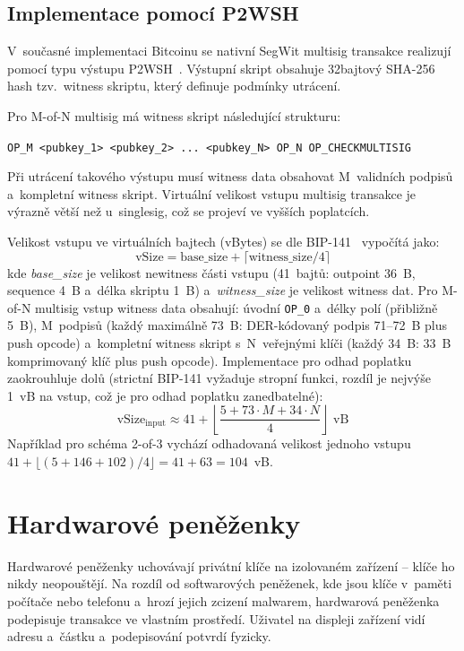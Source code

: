 \subsection{Implementace pomocí P2WSH}
\label{sec:p2wsh-multisig}

V~současné implementaci Bitcoinu se nativní SegWit multisig transakce realizují
pomocí typu výstupu P2WSH~\citep{BIP141}. Výstupní skript obsahuje 32bajtový
SHA-256 hash tzv.\ witness skriptu, který definuje podmínky utrácení.

Pro M-of-N multisig má witness skript následující strukturu:
\begin{center}
\texttt{OP\_M <pubkey\_1> <pubkey\_2> ... <pubkey\_N> OP\_N OP\_CHECKMULTISIG}
\end{center}

Při utrácení takového výstupu musí witness data obsahovat M~validních podpisů
a~kompletní witness skript. Virtuální velikost vstupu multisig transakce je
výrazně větší než u~singlesig, což se projeví ve vyšších poplatcích.

Velikost vstupu ve virtuálních bajtech (vBytes) se dle
BIP-141~\citep{BIP141} vypočítá jako:
\[
  \text{vSize} = \text{base\_size} + \lceil \text{witness\_size} / 4 \rceil
\]
kde \emph{base\_size} je velikost newitness části vstupu (41~bajtů: outpoint
36~B, sequence 4~B a~délka skriptu 1~B) a~\emph{witness\_size} je velikost
witness dat. Pro M-of-N multisig vstup witness data obsahují: úvodní
\texttt{OP\_0} a~délky polí (přibližně 5~B), M~podpisů (každý maximálně
73~B: DER-kódovaný podpis 71--72~B plus push opcode) a~kompletní witness
skript s~N~veřejnými klíči (každý 34~B: 33~B komprimovaný klíč plus push
opcode). Implementace pro odhad poplatku zaokrouhluje dolů
(strictní BIP-141 vyžaduje stropní funkci, rozdíl je nejvýše 1~vB
na vstup, což je pro odhad poplatku zanedbatelné):
\[
  \text{vSize}_{\text{input}} \approx 41 + \left\lfloor \frac{5 + 73 \cdot M + 34 \cdot N}{4} \right\rfloor \text{~vB}
\]
Například pro schéma 2-of-3 vychází odhadovaná velikost jednoho vstupu
$41 + \lfloor (5 + 146 + 102)/4 \rfloor = 41 + 63 = 104$~vB.


\section{Hardwarové peněženky}
\label{sec:hw-wallets}

Hardwarové peněženky uchovávají privátní klíče na izolovaném zařízení --
klíče ho nikdy neopouštějí. Na rozdíl od softwarových peněženek, kde jsou
klíče v~paměti počítače nebo telefonu a~hrozí jejich zcizení malwarem,
hardwarová peněženka podepisuje transakce ve vlastním prostředí. Uživatel
na displeji zařízení vidí adresu a~částku a~podepisování potvrdí fyzicky.

